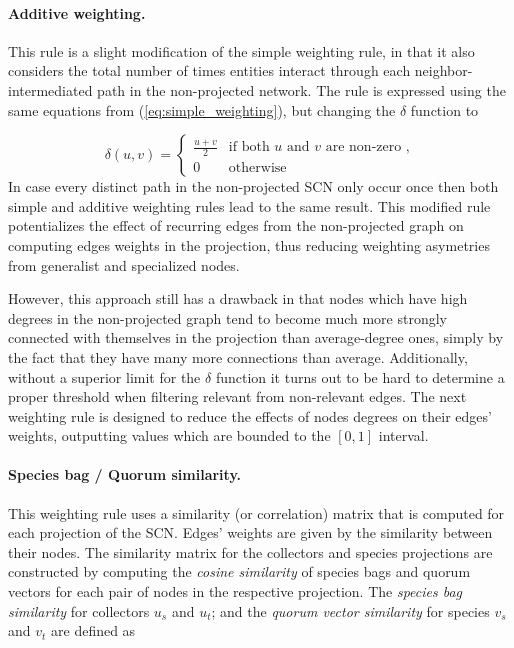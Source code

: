 {\paragraph*{Additive weighting.}
This rule is a slight modification of the simple weighting rule, in that it also considers the total number of times entities interact through each neighbor-intermediated path in the non-projected network. The rule is expressed using the same equations from (\ref{eq:simple_weighting}), but changing the $\delta$ function to
 
$$\delta(u,v) = 
\begin{cases}
\frac{u+v}{2} &  \mbox{if both } u \mbox{ and } v \mbox{ are non-zero ,}\\
0 & \mbox{otherwise}
\end{cases}
$$
In case every distinct path in the non-projected SCN only occur once then both simple and additive weighting rules lead to the same result. %
This modified rule potentializes the effect of recurring edges from the non-projected graph on computing edges weights in the projection, thus reducing weighting asymetries from generalist and specialized nodes.

However, this approach still has a drawback in that nodes which have high degrees in the non-projected graph tend to become much more strongly connected with themselves in the projection than average-degree ones, simply by the fact that they have many more connections than average.
Additionally, without a superior limit for the $\delta$ function it turns out to be hard to determine a proper threshold when filtering relevant from non-relevant edges. The next weighting rule is designed to reduce the effects of nodes degrees on their edges' weights, outputting values which are bounded to the $[0,1]$ interval.

\paragraph*{Species bag / Quorum similarity.}
This weighting rule uses a similarity (or correlation) matrix that is computed for each projection of the SCN. Edges' weights are given by the similarity between their nodes. The similarity matrix for the collectors and species projections are constructed by computing the  \textit{cosine similarity} of species bags and quorum vectors  for each pair of nodes in the respective projection. 
The \textit{species bag similarity} for collectors $u_s$ and $u_t$; and the \textit{quorum vector similarity} for species $v_s$ and $v_t$ are defined as

}
